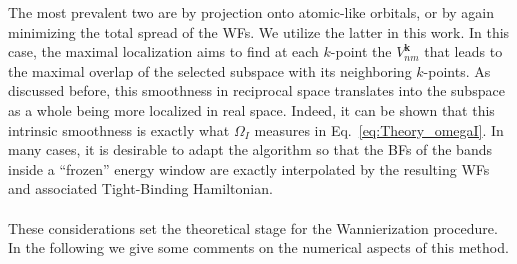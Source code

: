The most prevalent two are by projection onto atomic-like orbitals, or by again minimizing the total spread of the WFs.
We utilize the latter in this work.
In this case, the maximal localization aims to find at each $k$-point the $V_{nm}^{\bm{k}}$ that leads to the maximal overlap of the selected subspace with its neighboring $k$-points.
As discussed before, this smoothness in reciprocal space translates into the subspace as a whole being more localized in real space.
Indeed, it can be shown \cite{Marzari2012} that this intrinsic smoothness is exactly what $\Omega_I$ measures in Eq.~\eqref{eq:Theory_omegaI}. 
In many cases, it is desirable to adapt the algorithm so that the BFs of the bands inside a ``frozen'' energy window are exactly interpolated by the resulting WFs and associated Tight-Binding Hamiltonian.
\\\\
These considerations set the theoretical stage for the Wannierization procedure. In the following we give some comments on the numerical aspects of this method.

